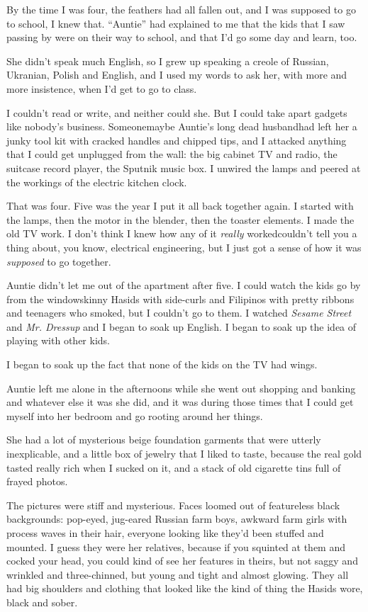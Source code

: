 By the time I was four, the feathers had all fallen out, and I was
supposed to go to school, I knew that.  ``Auntie'' had explained to me
that the kids that I saw passing by were on their way to school, and
that I'd go some day and learn, too.

She didn't speak much English, so I grew up speaking a creole of
Russian, Ukranian, Polish and English, and I used my words to ask her,
with more and more insistence, when I'd get to go to class.

I couldn't read or write, and neither could she.  But I could take
apart gadgets like nobody's business.  Someone\dash{}maybe Auntie's long
dead husband\dash{}had left her a junky tool kit with cracked handles and
chipped tips, and I attacked anything that I could get unplugged from
the wall:  the big cabinet TV and radio, the suitcase record player,
the Sputnik music box.  I unwired the lamps and peered at the workings
of the electric kitchen clock.

That was four.  Five was the year I put it all back together again.  I
started with the lamps, then the motor in the blender, then the
toaster elements.  I made the old TV work.  I don't think I knew how
any of it \textit{really} worked\dash{}couldn't tell you a thing about,
you know, electrical engineering, but I just got a sense of how it was
\textit{supposed} to go together.

Auntie didn't let me out of the apartment after five.  I could watch
the kids go by from the window\dash{}skinny Hasids with side-curls and
Filipinos with pretty ribbons and teenagers who smoked, but I couldn't
go to them.  I watched \textit{Sesame Street} and \textit{Mr. 
Dressup} and I began to soak up English.  I began to soak up the idea
of playing with other kids.

I began to soak up the fact that none of the kids on the TV had wings.

Auntie left me alone in the afternoons while she went out shopping and
banking and whatever else it was she did, and it was during those
times that I could get myself into her bedroom and go rooting around
her things.

She had a lot of mysterious beige foundation garments that were
utterly inexplicable, and a little box of jewelry that I liked to
taste, because the real gold tasted really rich when I sucked on it,
and a stack of old cigarette tins full of frayed photos.

The pictures were stiff and mysterious.  Faces loomed out of
featureless black backgrounds:  pop-eyed, jug-eared Russian farm boys,
awkward farm girls with process waves in their hair, everyone looking
like they'd been stuffed and mounted.  I guess they were her
relatives, because if you squinted at them and cocked your head, you
could kind of see her features in theirs, but not saggy and wrinkled
and three-chinned, but young and tight and almost glowing.  They all
had big shoulders and clothing that looked like the kind of thing the
Hasids wore, black and sober.

